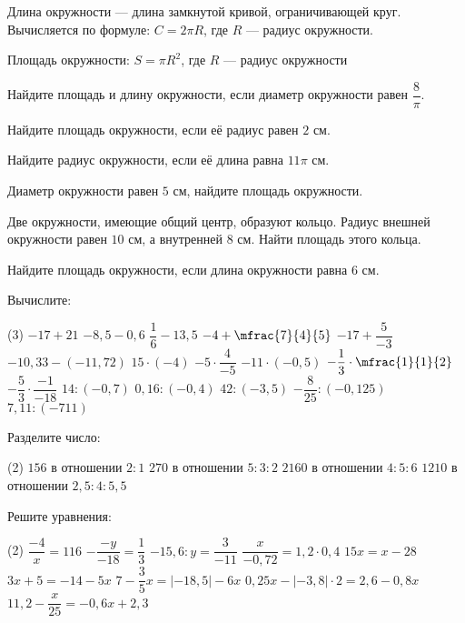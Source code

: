 \begin{class}[number=3-4]
	\begin{definit}
		Длина окружности --- длина замкнутой кривой, ограничивающей круг. Вычисляется по формуле: \( C = 2 \pi R \), где \(R\) --- радиус окружности.
	\end{definit}
	\begin{definit}
		Площадь окружности: \( S = \pi R^2 \), где \(R\) --- радиус окружности
	\end{definit}
	\begin{listofex}
		\item Найдите площадь и длину окружности, если диаметр окружности равен \( \dfrac{8}{\pi} \).
		\item Найдите площадь окружности, если её радиус равен \( 2 \) см.
		\item Найдите радиус окружности, если её длина равна \( 11\pi \) см.
		\item Диаметр окружности равен \(5\) см, найдите площадь окружности.
		\item Две окружности, имеющие общий центр, образуют кольцо. Радиус внешней окружности равен \(10\) см, а внутренней \(8\) см. Найти площадь этого кольца.
		\item Найдите площадь окружности, если длина окружности равна \(6\) см.
		\item Вычислите:
		\begin{tasks}(3)
			\task \( -17 + 21 \)
			\task \( -8,5 - 0,6 \)
			\task \( \dfrac{1}{6} - 13,5 \)
			\task \( -4 + \mfrac{7}{4}{5} \)
			\task \( -17 + \dfrac{5}{-3} \)
			\task \( -10,33 - (-11,72) \)
			\task \( 15 \cdot (-4) \)
			\task \( -5 \cdot \dfrac{4}{-5} \)
			\task \( -11 \cdot (-0,5) \)
			\task \( -\dfrac{1}{3} \cdot \mfrac{1}{1}{2} \)
			\task \( -\dfrac{5}{3}\cdot \dfrac{-1}{-18} \)
			\task \( 14 : (-0,7) \)
			\task \( 0,16 : (-0,4) \)
			\task \( 42 : (-3,5) \)
			\task \( -\dfrac{8}{25} : (-0,125) \)
			\task \( 7,11 : (-711) \)
		\end{tasks}
		\item Разделите число:
		\begin{tasks}(2)
			\task \( 156 \) в отношении \( 2:1 \)
			\task \( 270 \) в отношении \( 5:3:2 \)
			\task \( 2160 \) в отношении \( 4:5:6 \)
			\task \( 1210 \) в отношении \( 2,5:4:5,5 \)
		\end{tasks}
		\newpage
		\item Решите уравнения:
		\begin{tasks}(2)
			\task \( \dfrac{-4}{x}=116 \)
			\task \( -\dfrac{-y}{-18}=\dfrac{1}{3} \)
			\task \( -15,6:y=\dfrac{3}{-11} \)
			\task \( \dfrac{x}{-0,72}=1,2 \cdot 0,4 \)
			\task \( 15x=x-28 \)
			\task \( 3x+5=-14-5x \)
			\task \( 7-\dfrac{3}{5}x=|-18,5|-6x \)
			\task \( 0,25x-|-3,8| \cdot 2 = 2,6 - 0,8x \)
			\task \( 11,2-\dfrac{x}{25}=-0,6x+2,3 \)
		\end{tasks}
	\end{listofex}
\end{class}

